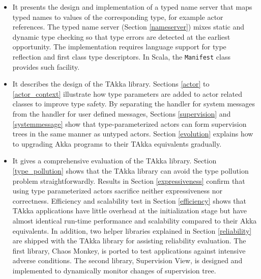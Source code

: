 \begin{itemize}
 \item It presents the design and implementation of a typed name server
that maps typed names to values of the corresponding type, for example actor 
references.  The typed name server (Section \ref{nameserver}) mixes 
static and dynamic type checking so that type  errors are detected at the earliest 
opportunity.  The implementation requires language support for type reflection 
and first class type descriptors.  In Scala, the {\tt Manifest} class provides 
such facility.

 \item It describes the design of the TAkka library.  Sections \ref{actor} to
\ref{actor_context} illustrate how type parameters are added to actor related
classes to improve type safety.   By separating the handler for system 
messages from the handler for user defined messages, Sections \ref{supervision}
and \ref{systemmessage} show that type-parameterized actors can form
supervision trees in the same manner as untyped actors.  Section 
\ref{evolution} explains how to upgrading Akka programs to their TAkka 
equivalents gradually.
 
 \item It gives a comprehensive evaluation of the TAkka library.  Section 
\ref{type_pollution} shows that the TAkka library can avoid the type pollution 
problem straightforwardly.  Results in
Section \ref{expressiveness} confirm that using type parameterized actors 
sacrifice neither expressiveness nor correctness.  Efficiency and 
scalability test in Section \ref{efficiency} shows that TAkka applications have 
little overhead at the initialization stage but have almost identical run-time 
performance and scalability compared to their Akka equivalents.  In 
addition, two helper libraries explained in Section \ref{reliability} are 
shipped with the TAkka library for assisting reliability evaluation.  The 
first library, Chaos Monkey, is ported to test applications against intensive 
adverse conditions.  The second library, Supervision View, is 
designed and implemented to dynamically monitor changes of supervision tree.
 
\end{itemize}
